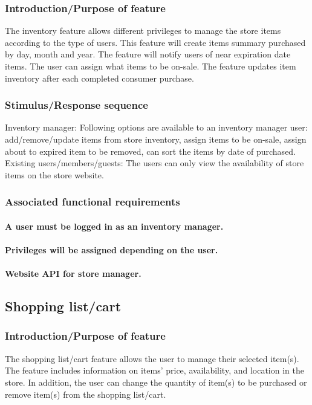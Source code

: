 \documentclass{scrreprt}
\begin{document}
\subsubsection{Introduction/Purpose of feature}
The inventory feature allows different privileges to manage the store items according to the type of users. This feature will create items summary purchased by day, month and year. The feature will notify users of near expiration date items. The user can assign what items to be on-sale. The feature updates item inventory after each completed consumer purchase.

\subsubsection{Stimulus/Response sequence}
Inventory manager:
Following options are available to an inventory manager user: add/remove/update items from store inventory, assign items to be on-sale, assign about to expired item to be removed, can sort the items by date of purchased.
Existing users/members/guests:
The users can only view the availability of store items on the store website.

\subsubsection{Associated functional requirements}
\paragraph[]{\normalfont A user must be logged in as an inventory manager.}
\paragraph[]{\normalfont Privileges will be assigned depending on the user.}
\paragraph[]{\normalfont Website API for store manager.}

\subsection{Shopping list/cart}
\subsubsection{Introduction/Purpose of feature}
The shopping list/cart feature allows the user to manage their selected item(s). The feature includes information on items’ price, availability, and location in the store. In addition, the user can change the quantity of item(s) to be purchased or remove item(s) from the shopping list/cart.
\end{document}
